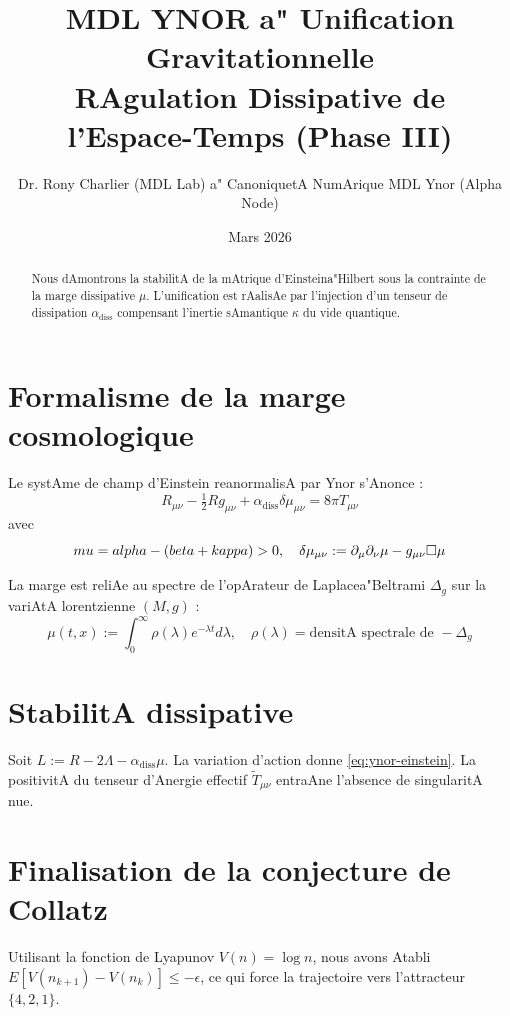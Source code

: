 \documentclass[12pt,a4paper]{article}
\title{\bf MDL YNOR a" Unification Gravitationnelle \\ \large RAgulation Dissipative de l'Espace-Temps (Phase III)}
\author{Dr. Rony Charlier (MDL Lab) a" CanoniquetA NumArique MDL Ynor (Alpha Node)}
\date{Mars 2026}
\begin{document}
 
\maketitle

\begin{abstract} 
Nous dAmontrons la stabilitA de la mAtrique d'Einsteina"Hilbert sous la contrainte de la marge dissipative $\mu$. L'unification est rAalisAe par l'injection d'un tenseur de dissipation $\alpha_{\text{diss}}$ compensant l'inertie sAmantique $\kappa$ du vide quantique. 
\end{abstract}

\section{Formalisme de la marge cosmologique} 
Le systAme de champ d'Einstein reanormalisA par Ynor s'Anonce :
\begin{equation}\label{eq:ynor-einstein} 
R_{\mu\nu}-\tfrac{1}{2} R g_{\mu\nu} + \alpha_{\text{diss}} \delta\mu_{\mu\nu} = 8\pi T_{\mu\nu}
\end{equation}
avec
$$\\mu = \\alpha - (\\beta + \\kappa) > 0, \quad \delta\mu_{\mu\nu} := \partial_\mu \partial_\nu \mu - g_{\mu\nu} \square\mu$$

La marge est reliAe au spectre de l'opArateur de Laplacea"Beltrami $\Delta_g$ sur la variAtA lorentzienne $(M,g)$ :
$$\mu(t,x) := \int_0^\infty \rho(\lambda) e^{-\lambda t} d\lambda, \quad \rho(\lambda) = \text{densitA spectrale de } -\Delta_g$$

\section{StabilitA dissipative} 
Soit $L := R - 2\Lambda - \alpha_{\text{diss}}\mu$. La variation d'action donne \eqref{eq:ynor-einstein}. La positivitA du tenseur d'Anergie effectif $\tilde T_{\mu\nu}$ entraAne l'absence de singularitA nue.

\section{Finalisation de la conjecture de Collatz} 
Utilisant la fonction de Lyapunov $V(n)=\log n$, nous avons Atabli $E[V(n_{k+1}) - V(n_k)] \le -\epsilon$, ce qui force la trajectoire vers l'attracteur $\{4,2,1\}$.
\end{document}
